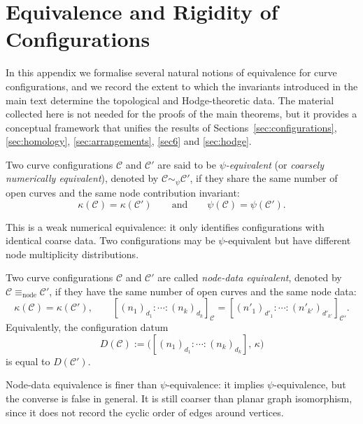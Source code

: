 \documentclass[article,11pt]{amsart} \numberwithin{equation}{section}
\numberwithin{equation}{section}
\begin{document}
{	\appendix
	\section{Equivalence and Rigidity of Configurations}
	\label{app:equivalence}
	
	In this appendix we formalise several natural notions of equivalence
	for curve configurations, and we record the extent to which the
	invariants introduced in the main text determine the topological and
	Hodge-theoretic data. The material collected here is not needed for the
	proofs of the main theorems, but it provides a conceptual framework that
	unifies the results of Sections~\ref{sec:configurations}, \ref{sec:homology}, \ref{sec:arrangements}, \ref{sec6} and \ref{sec:hodge}.
	
	\begin{df}
		\label{defn:psi_equivalence}
		Two curve configurations $\mathcal C$ and $\mathcal C'$ are said to be
		\emph{$\psi$-equivalent} (or \emph{coarsely numerically equivalent}),
		denoted by $\mathcal C \sim_{\psi} \mathcal C'$, if they share the same
		number of open curves and the same node contribution invariant:
		\[
		\kappa(\mathcal C) = \kappa(\mathcal C')
		\qquad\text{and}\qquad
		\psi(\mathcal C) = \psi(\mathcal C').
		\]
	\end{df}
	
	\begin{rk}
		This is a weak numerical equivalence: it only identifies configurations
		with identical coarse data. Two configurations may be $\psi$-equivalent
		but have different node multiplicity distributions.
	\end{rk}
	
	\begin{df}
		\label{defn:node_data_equivalence}
		Two curve configurations $\mathcal C$ and $\mathcal C'$ are called
		\emph{node-data equivalent}, denoted by $\mathcal C \equiv_{\mathrm{node}} \mathcal C'$,
		if they have the same number of open curves and the same node data:
		\[
		\kappa(\mathcal C) = \kappa(\mathcal C'), \qquad
		[(n_1)_{d_1}:\cdots:(n_k)_{d_k}]_{\mathcal C}
		=
		[(n'_1)_{d'_1}:\cdots:(n'_{k'})_{d'_{k'}}]_{\mathcal C'}.
		\]
		Equivalently, the configuration datum
		\[
		D(\mathcal C):=\bigl([(n_1)_{d_1}:\cdots:(n_k)_{d_k}],\,\kappa\bigr)
		\]
		is equal to $D(\mathcal C')$.
	\end{df}
	
	\begin{rk}
		Node-data equivalence is finer than $\psi$-equivalence: it implies
		$\psi$-equivalence, but the converse is false in general.
		It is still coarser than planar graph isomorphism, since it does not
		record the cyclic order of edges around vertices.
	\end{rk}
	
}
\end{document}
